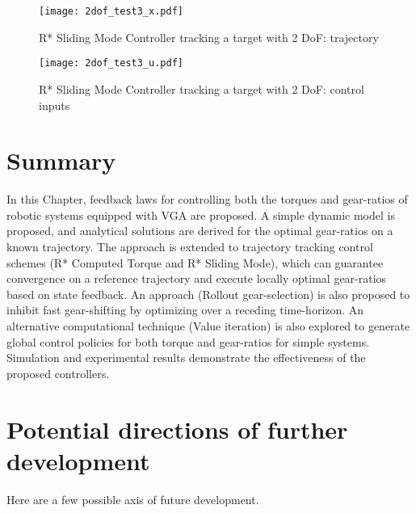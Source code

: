 %
\begin{figure}[htp]
	\centering
		\texttt{[image: 2dof\_test3\_x.pdf]}
	\caption{R* Sliding Mode Controller tracking a target with 2 DoF: trajectory}
	\label{fig:exp_traj_2dof_x}
\end{figure}
%

%
\begin{figure}[htp]
	\centering
		\texttt{[image: 2dof\_test3\_u.pdf]}
	\caption{R* Sliding Mode Controller tracking a target with 2 DoF: control inputs}
	\label{fig:exp_traj_2dof_u}
\end{figure}
%





\newpage

\section{Summary}

In this Chapter, feedback laws for controlling both the torques and gear-ratios of robotic systems equipped with VGA are proposed. A simple dynamic model is proposed, and analytical solutions are derived for the optimal gear-ratios on a known trajectory. The approach is extended to trajectory tracking control schemes (R* Computed Torque and R* Sliding Mode), which can guarantee convergence on a reference trajectory and execute locally optimal gear-ratios based on state feedback. An approach (Rollout gear-selection) is also proposed to inhibit fast gear-shifting by optimizing over a receding time-horizon. An alternative computational technique (Value iteration) is also explored to generate global control policies for both torque and gear-ratios for simple systems. Simulation and experimental results demonstrate the effectiveness of the proposed controllers.

\section{Potential directions of further development}

Here are a few possible axis of future development. 

